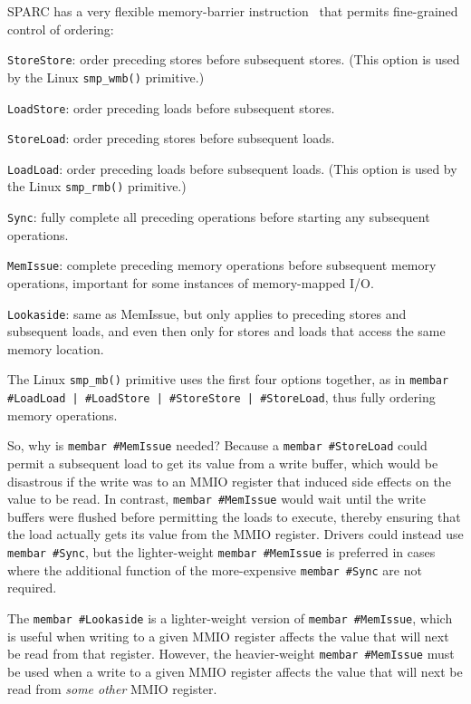SPARC has a very flexible memory-barrier instruction~\cite{SPARC94}
that permits fine-grained control of ordering:
\begin{description}
\item	{\tt StoreStore}: order preceding stores before subsequent stores.
	(This option is used by the Linux {\tt smp\_wmb()} primitive.)
\item	{\tt LoadStore}: order preceding loads before subsequent stores.
\item	{\tt StoreLoad}: order preceding stores before subsequent loads.
\item	{\tt LoadLoad}: order preceding loads before subsequent loads.
	(This option is used by the Linux {\tt smp\_rmb()} primitive.)
\item	{\tt Sync}: fully complete all preceding operations before starting
	any subsequent operations.
\item	{\tt MemIssue}: complete preceding memory operations before subsequent
	memory operations, important for some instances of memory-mapped
	I/O.
\item	{\tt Lookaside}: same as MemIssue, but only applies to preceding stores
	and subsequent loads, and even then only for stores and loads that
	access the same memory location.
\end{description}

The Linux {\tt smp\_mb()} primitive uses the first four options together,
as in
{\tt membar \#LoadLoad | \#LoadStore | \#StoreStore | \#StoreLoad},
thus fully ordering memory operations.

So, why is {\tt membar \#MemIssue} needed?
Because a {\tt membar \#StoreLoad} could permit a subsequent
load to get its value from a write buffer, which would be
disastrous if the write was to an MMIO register that induced side effects
on the value to be read.
In contrast, {\tt membar \#MemIssue} would wait until the write buffers
were flushed before permitting the loads to execute,
thereby ensuring that the load actually gets its value from the MMIO register.
Drivers could instead use {\tt membar \#Sync}, but the lighter-weight
{\tt membar \#MemIssue} is preferred in cases where the additional function
of the more-expensive {\tt membar \#Sync} are not required.

The {\tt membar \#Lookaside} is a lighter-weight version of
{\tt membar \#MemIssue}, which is useful when writing to a given MMIO register
affects the value that will next be read from that register.
However, the heavier-weight {\tt membar \#MemIssue} must be used when
a write to a given MMIO register affects the value that will next be
read from {\em some other} MMIO register.

